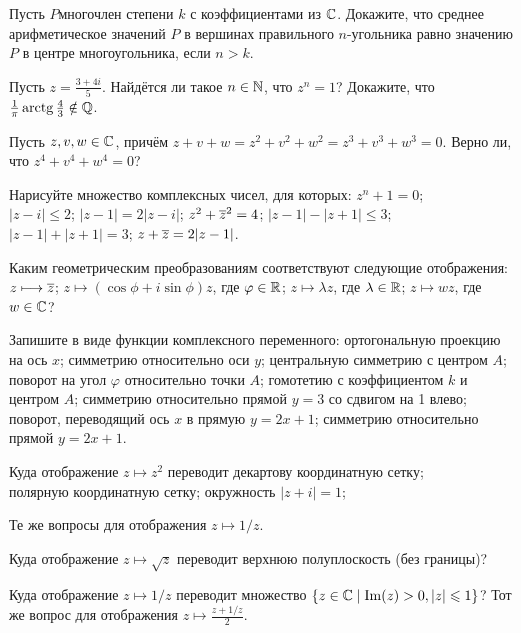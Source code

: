 \documentclass[a4paper,12pt]{article}
\begin{document}
Пусть $P$\т многочлен степени $k$ с коэффициентами из $\mathbb{C}$. Докажите, что среднее арифметическое значений $P$ в вершинах правильного $n$-угольника равно значению $P$ в центре многоугольника, если $n>k$.

Пусть $z=\frac{3+4i}{5}$. Найдётся ли такое $n\in\mathbb{N}$, что $z^n=1$?
Докажите, что $\frac1\pi\arctg\frac43\notin\Q$.

Пусть $z,v,w\in\mathbb{C}$, причём $z+v+w=z^2+v^2+w^2=z^3+v^3+w^3=0$. Верно ли, что $z^4+v^4+w^4=0$?

Нарисуйте множество комплексных чисел, для которых:
 $z^n+1=0$;\\
 $|z-i|\leq2$;
 $|z-1|=2|z-i|$;
 $z^2+\overline z^2=4$;
 $|z-1|-|z+1|\leq3$;
 $|z-1|+|z+1|=3$;
 $z+\overline z=2|z-1|$.

Каким геометрическим преобразованиям соответствуют следующие отображения:
$z\longmapsto\overline z$;
$z\longmapsto(\cos\phi+i\sin\phi)z$, где $\varphi\in\mathbb{R}$;
$z\longmapsto \lambda z$, где $\lambda\in\mathbb{R}$;
$z\longmapsto wz$, где $w\in\mathbb{C}$?

Запишите в виде функции комплексного переменного:
 ортогональную проекцию на ось $x$;
 симметрию относительно оси $y$;
 центральную симметрию с центром $A$;
 поворот на угол $\varphi$ относительно точки $A$;
 гомотетию с коэффициентом $k$ и центром $A$;
 симметрию относительно прямой $y=3$ со сдвигом на 1 влево;
 поворот, переводящий ось $x$ в прямую $y=2x+1$;
 симметрию относительно прямой $y=2x+1$.

Куда отображение $z\longmapsto z^2$ переводит
декартову координатную сетку;\\
полярную координатную сетку;
окружность $|z+i|=1$;

 Те же вопросы для отображения
$z\longmapsto 1/z$.

Куда отображение $z\longmapsto\sqrt z$ переводит верхнюю полуплоскость (без границы)?

Куда отображение $z\longmapsto1/z$ переводит множество $\{z\in\mathbb{C}\mid\mathop{\mathrm{Im}}(z)>0,|z|\leqslant1\}$?
Тот же вопрос для отображения $z\longmapsto\frac{z + 1/z}{2}$.

{}
\end{document}
